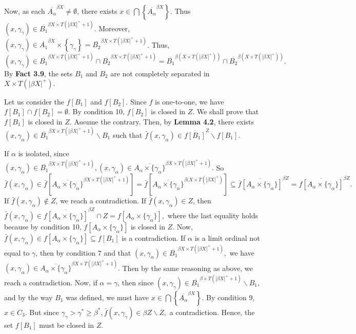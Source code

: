 \documentclass{article}
\begin{document}
Now, as each $\overline{A_\alpha}^{\beta X} \neq \emptyset$, there exists $x\in \bigcap \left\{\overline{A_\alpha}^{\beta X}\right\}.$ Thus $(x,\gamma_\gamma)\in \overline{B_1}^{\beta X \times T(|\beta X|^+ +1)}$. Moreover, $(x, \gamma_\gamma)\in \overline{A_1}^{\beta X} \times \left\{\gamma_\gamma\right\}= \overline{B_2}^{\beta X \times T(|\beta X|^+ +1)}$. Thus, $(x,\gamma_\gamma)\in \overline{B_1}^{\beta X\times T(|\beta X|^+ +1)} \cap \overline{B_2}^{\beta X\times T(|\beta X|^+ +1)}=\overline{B_1}^{\beta\left( X\times T(|\beta X|^+)\right)} \cap \overline{B_2}^{\beta \left(X\times T(|\beta X|^+)\right)}.$ By \textbf{Fact 3.9}, the sets $B_1$ and $B_2$ are not completely separated in $X\times T(|\beta X|^+).$

\vskip 15pt


Let us consider the $f\left[B_1\right]$ and $f\left[B_2\right].$ Since $f$ is one-to-one, we have $f\left[B_1\right] \cap f\left[B_2\right]=\emptyset.$ 
By condition 10, $f\left[B_2\right]$ is closed in $Z$. We shall prove that $f\left[B_1\right]$ is closed in $Z$. Assume the contrary. Then, by \textbf{Lemma 4.2}, there exists $(x,\gamma_\alpha)\in \overline{B_1}^{\beta X\times T(|\beta X|^+ +1)} \backslash B_1$ such that $\bar{f}(x,\gamma_\alpha)\in \overline{f\left[B_1\right]}^Z\backslash f\left[B_1\right].$ 
\vskip 15pt

If $\alpha$ is isolated, since $(x,\gamma_\alpha)\in \overline{B_1}^{\beta X\times T(|\beta X|^+ +1)}, (x,\gamma_\alpha)\in \overline{A_\alpha\times \{\gamma_\alpha\}}^{\beta X \times T(|\beta X|^+ +1)}.$ So $\bar{f}(x,\gamma_\alpha)\in \bar{f}\left[\overline{A_\alpha\times \{\gamma_\alpha\}}^{\beta X\times T(|\beta X|^+ +1)}\right]=\bar{f} \left[\overline{A_\alpha\times \{\gamma_\alpha\}}^{\beta (X\times T(|\beta X|^+)}\right] \subseteq \overline{\bar{f}\left[A_\alpha\times \{\gamma_\alpha\}\right]}^{\beta Z}=\overline{f\left[A_\alpha\times \{\gamma_\alpha\}\right]}^{\beta Z}.$  If $\bar{f}(x,\gamma_\alpha)\notin Z$, we reach a contradiction. If $\bar{f}(x,\gamma_\alpha)\in Z$, then $\bar{f}(x,\gamma_\alpha)\in
\overline{f\left[A_\alpha\times \{\gamma_\alpha\}\right]}^{\beta Z}\cap Z=f\left[A_\alpha \times \{\gamma_\alpha\}\right],$ where the last equality holds because by condition 10, $f\left[A_\alpha\times \{\gamma_\alpha\}\right]$ is closed in $Z$. Now, $\bar{f}(x,\gamma_\alpha)\in f\left[A_\alpha \times \{\gamma_\alpha\}\right]\subseteq f\left[B_1\right]$ is a contradiction.
\vskip 15pt
If $\alpha$ is a limit ordinal not equal to $\gamma$, then by condition 7 and that $(x,\gamma_\alpha)\in \overline{B_1}^{\beta X\times T(|\beta X|^+ +1)},$  we have $(x,\gamma_\alpha)\in \overline{A_\alpha\times \{\gamma_\alpha\}}^{\beta X \times T(|\beta X|^+ +1)}.$ Then by the same reasoning as above, we reach a contradiction.
\vskip 15pt
Now, if $\alpha=\gamma$, then since $(x,\gamma_\gamma) \in \overline{B_1}^{\beta \times T(|\beta X|^+ +1)}\backslash B_1$, and by the way $B_1$ was defined, we must have $x\in \bigcap \left\{\overline{A_\alpha}^{\beta X}\right\}$. By condition 9, $x\in C_3$. But since $\gamma_\gamma> \gamma^* \geq \beta^*, \bar{f}(x,\gamma_\gamma)\in \beta Z\backslash Z,$ a contradiction. Hence, the set $f[B_1]$ must be closed in $Z$.
\end{document}
